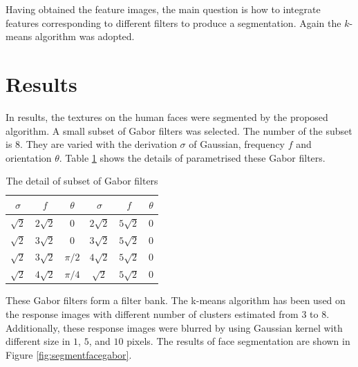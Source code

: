 Having obtained the feature images, the main question is how to integrate features corresponding to different filters to produce a segmentation. Again the $k$-means algorithm was adopted. 
\section{Results}
In results, the textures on the human faces were segmented by the proposed algorithm. A small subset of Gabor filters was selected. The number of the subset is $8$. They are varied with the derivation $\sigma$ of Gaussian, frequency $f$ and orientation $\theta$. \mbox{Table} \ref{tab:detailsubsetgabor} shows the details of parametrised these Gabor filters. 
\begin{table}[ht]
\begin{center}
 \begin{tabular}{|c|c|c||c|c|c|}
 \hline
$\sigma$ & $f$ & $\theta$ & $\sigma$ & $f$ & $\theta$ \\
 \hline
$\sqrt{2}$ & $2\sqrt{2}$ & $0$ & $2\sqrt{2}$ & $5\sqrt{2}$ & $0$ \\
$\sqrt{2}$ & $3\sqrt{2}$ & $0$ & $3\sqrt{2}$ & $5\sqrt{2}$ & $0$ \\
$\sqrt{2}$ & $3\sqrt{2}$ & $\pi/2$ & $4\sqrt{2}$ & $5\sqrt{2}$ & $0$ \\
$\sqrt{2}$ & $4\sqrt{2}$ & $\pi/4$ & $\sqrt{2}$ & $5\sqrt{2}$ & $0$ \\
 \hline
 \end{tabular} 
\caption{The detail of subset of Gabor filters}
\label{tab:detailsubsetgabor}
\end{center}
\end{table} 
These Gabor filters form a filter bank. The k-means algorithm has been used on the response images with different number of clusters estimated from $3$ to $8$. Additionally, these response images were blurred by using Gaussian kernel with different size in $1$, $5$, and $10$ pixels. The results of face segmentation are shown in \mbox{Figure} \ref{fig:segmentfacegabor}.
